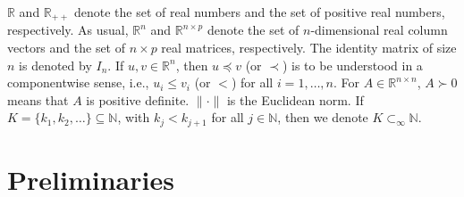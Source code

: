 \documentclass[11pt]{article}
\numberwithin{assumption}{section}
\newcommand{\N}{\mathbb{N}}
\newcommand{\R}{\mathbb{R}}
\newcommand{\subsetinf}{\displaystyle\mathop{\subset}_{\infty}}
\begin{document}

\vspace{5pt}
 $\mathbb{R}$  and $\mathbb{R}_{++}$ denote the set of real numbers and the set of  positive real numbers, respectively. As usual, $\mathbb{R}^n$ and $\mathbb{R}^{n\times p}$ denote the set of $n$-dimensional real column vectors and the set of ${n\times p}$ real matrices,  respectively.
The identity matrix of size $n$ is denoted by $I_n$.  
If $u,v\in\R^n$, then $u\preceq v$ (or $\prec$) is to be understood in a componentwise sense, i.e., $u_i\leq v_i$ (or $<$) for all $i=1,\ldots,n$.
For $A\in\R^{n\times n}$, $A \succ 0$ means that $A$ is positive definite.
$\|\cdot\|$ is the Euclidean norm.
If $K = \{k_1, k_2, \ldots \} \subseteq \N$, with $k_j < k_{j+1}$ for all $j\in \N$, then  we denote $K  \subsetinf \N$.

\section{Preliminaries} \label{sec:pre}
\end{document}

